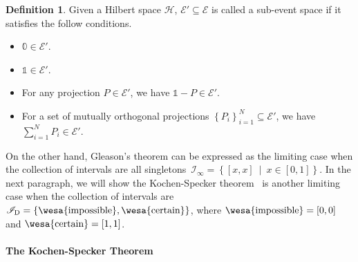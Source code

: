 \documentclass[english,reprint, aps, prl,superscriptaddress, showpacs,
showkeys]{revtex4-1}
\theoremstyle{plain}
\theoremstyle{definition}
\newtheorem{definition}[thm]{Definition}
\newcommand{\Hilb}{\mathcal{H}}
\newcommand{\events}{\ensuremath{\mathcal{E}}}
\newcommand{\imposs}{{\mbox{\wesa{impossible}}}}
\newcommand{\necess}{{\mbox{\wesa{certain}}}}
\newcommand{\set}[2]{\ensuremath{\left\{ {#1}~\middle|~{#2}\right\} }}
\begin{document}
\begin{definition}\label{def:sub-event-space}Given a Hilbert space
$\Hilb$, $\events'\subseteq\events$ is called a sub-event space
if it satisfies the follow conditions.
\begin{itemize}
\item $\mathbb{0}\in\events'$.
\item $\mathbb{1}\in\events'$.
\item For any projection $P\in\events'$, we have $\mathbb{1}-P\in\events'$.
\item For a set of mutually orthogonal projections $\left\{ P_{i}\right\} _{i=1}^{N}\subseteq\events'$,
we have $\sum_{i=1}^{N}P_{i}\in\events'$.
\end{itemize}
\end{definition}

On the other hand, Gleason's theorem can be expressed as the limiting
case when the collection of intervals are all singletons~$\mathscr{I}_{\infty}=\set{\left[x,x\right]}{x\in\left[0,1\right]}$.
In the next paragraph, we will show the Kochen-Specker theorem~\citep{kochenspecker1967,peres1995quantum,Redhead1987-REDINA}
is another limiting case when the collection of intervals are $\mathscr{I}_{\mathrm{D}}=\left\{ \imposs,\necess\right\} $,
where $\imposs=\left[0,0\right]$ and $\necess=\left[1,1\right]$.

\paragraph{The Kochen-Specker Theorem}
\end{document}
